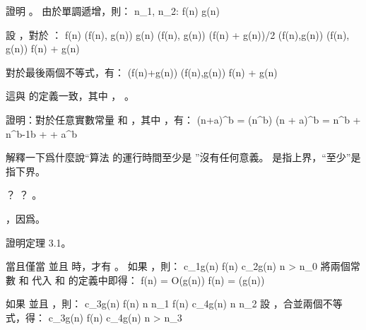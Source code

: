 \startsection[
  title={Asymptotic notation},
]

\startEXERCISE
證明 。
\stopEXERCISE
\startANSWER
由於單調遞增，則：
\startformula\startalign[n=3]
\NC \exists n_1, n_2: \NC f(n)  \NC \quad{} \NR
\NC                   \NC g(n)  \NC \quad{} \NR
\stopalign\stopformula

設 ，對於 ：
\startformula\startalign
\NC f(n) \NC \leq \max(f(n), g(n)) \NR
\NC g(n) \NC \leq \max(f(n), g(n)) \NR
\NC (f(n) + g(n))/2 \NC \leq \max(f(n),g(n)) \NR
\NC \max(f(n), g(n)) \NC \leq f(n) + g(n) \NR
\stopalign\stopformula

對於最後兩個不等式，有：
 \leq {}(f(n)+g(n)) \leq \max(f(n),g(n)) \leq f(n) + g(n)
\stopformula

這與  的定義一致，其中 ， 。

\stopANSWER

\startEXERCISE
證明：對於任意實數常量  和 ，其中 ，有：
\startformula
(n+a)^b = \Theta(n^b)
\stopformula
\stopEXERCISE
\startANSWER
\startformula
(n + a)^b = n^b + n^{b-1}b + \cdots + a^b
\stopformula
\stopANSWER

\startEXERCISE
解釋一下爲什麼說“算法  的運行時間至少是 ”沒有任何意義。
\stopEXERCISE
\startANSWER
{} 是指上界，“至少”是指下界。
\stopANSWER

\startEXERCISE
{}？ ？
\stopEXERCISE
\startANSWER
{}。

，因爲。
\stopANSWER

\startEXERCISE
證明定理 3.1。

當且僅當  並且  時，才有 。
\stopEXERCISE
\startANSWER
如果 ，則：
 \leq c_1g(n) \leq f(n) \leq c_2g(n) \quad {} n > n_0
\stopformula
將兩個常數  和  代入  和 \m{\Omega} 的定義中即得：
\startformula\startalign
\NC f(n) \NC = O(g(n)) \NR
\NC f(n) \NC = \Omega(g(n)) \NR
\stopalign\stopformula

如果  並且 ，則：
\startformula{} \leq c_3g(n) \leq f(n) \NC \quad {} n \geq n_1  \leq f(n) \leq c_4g(n) \NC \quad {} n \geq n_2 \NR
\stopalign\stopformula
設 ，合並兩個不等式，得：
 \leq c_3g(n) \leq f(n) \leq c_4g(n) \quad {} n > n_3
\stopformula
\stopANSWER

